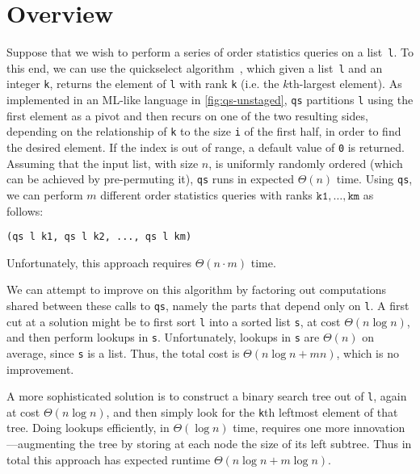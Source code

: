 
\section{Overview}
\label{sec:overview}

\begin{abstrsyn}

Suppose that we wish to perform a series of order statistics queries
on a list~\texttt{l}. To this end, we can use the quickselect
algorithm~\cite{Hoare:1961}, which given a list~\texttt{l} and an integer
\texttt{k}, returns the element of \texttt{l} with rank \texttt{k} (i.e. the $k$th-largest element).
As implemented in an ML-like language in \ref{fig:qs-unstaged},
\texttt{qs} partitions \texttt{l} using the first element as
a pivot and then recurs on one of the two resulting sides, depending on
the relationship of \texttt{k} to the size \texttt{i} of the first half, in
order to find the desired element.  
If the index is out of range, a default value of \texttt{0} is returned.
Assuming that the input list, with size $n$, is uniformly
randomly ordered (which can be achieved by pre-permuting it), \texttt{qs}
runs in expected $\Theta(n)$ time.
%
Using \texttt{qs}, we can perform $m$ different order statistics queries with
ranks $\mathtt{k1},\dots,\mathtt{km}$ as follows:
%
\begin{lstlisting}
(qs l k1, qs l k2, ..., qs l km)
\end{lstlisting}
%
Unfortunately, this approach requires $\Theta(n \cdot m)$ time.

We can attempt to improve on this algorithm by factoring out computations shared
between these calls to \texttt{qs}, 
namely the parts that depend only on \texttt{l}.
A first cut at a solution might be to first sort \texttt{l} into
a sorted list \texttt{s}, at cost $\Theta(n \log n)$, and then perform lookups in \texttt{s}.
Unfortunately, lookups in \texttt{s} are $\Theta(n)$ on average, 
since \texttt{s} is a list.
Thus, the total cost is $\Theta(n \log n + mn)$, which is no improvement.  

A more sophisticated solution is to construct a binary search
tree out of \texttt{l}, again at cost $\Theta(n\log{n})$, and then simply look for the \texttt{k}th
leftmost element of that tree. 
Doing lookups efficiently, in $\Theta(\log{n})$ time, 
requires one more innovation---augmenting the tree 
by storing at each node the size of its left subtree. 
Thus in total this approach has expected runtime $\Theta(n\log{n} + m\log{n})$.


\end{abstrsyn}
